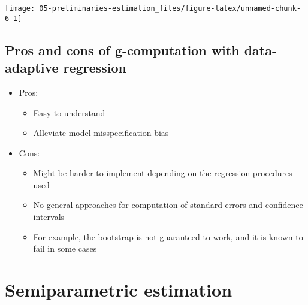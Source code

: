 \documentclass[
  12pt,
]{book}
\providecommand{\tightlist}{%
  \setlength{\itemsep}{0pt}\setlength{\parskip}{0pt}}
\theoremstyle{definition}
\theoremstyle{definition}
\theoremstyle{definition}
\newcommand{\1}{\mathbbm{1}}
\begin{document}
\begin{center}\texttt{[image: 05-preliminaries-estimation\_files/figure-latex/unnamed-chunk-6-1]} \end{center}

\hypertarget{pros-and-cons-of-g-computation-with-data-adaptive-regression}{%
\subsection{Pros and cons of g-computation with data-adaptive regression}\label{pros-and-cons-of-g-computation-with-data-adaptive-regression}}

\begin{itemize}
\tightlist
\item
  Pros:

  \begin{itemize}
  \tightlist
  \item
    Easy to understand
  \item
    Alleviate model-misspecification bias
  \end{itemize}
\item
  Cons:

  \begin{itemize}
  \tightlist
  \item
    Might be harder to implement depending on the regression procedures used
  \item
    No general approaches for computation of standard errors and confidence
    intervals
  \item
    For example, the bootstrap is not guaranteed to work, and it is known to
    fail in some cases
  \end{itemize}
\end{itemize}

\hypertarget{semiparametric-estimation}{%
\section{Semiparametric estimation}\label{semiparametric-estimation}}
\end{document}
